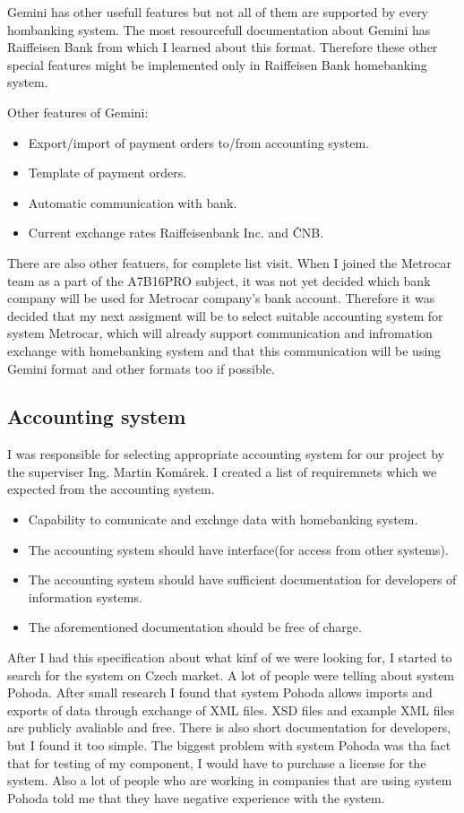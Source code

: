 \documentclass[11pt,twoside,a4paper]{book}
\begin{document}
Gemini has other usefull features but not all of them are supported by every hombanking system. 
The most resourcefull documentation about Gemini has Raiffeisen Bank\cite{rfb} from which I learned about this format.
Therefore these other special features might be implemented only in Raiffeisen Bank homebanking system. 

Other features of Gemini:
\begin{itemize}
	\item Export/import of payment orders to/from accounting system.
	\item Template of payment orders.
	\item Automatic communication with bank.
	\item Current exchange rates Raiffeisenbank Inc. and ČNB.
\end{itemize}
There are also other featuers, for complete list visit\cite{rfb}. When I joined the Metrocar team as a part of the A7B16PRO
subject, it was not yet decided which bank company will be used for Metrocar company's bank account. Therefore it was decided 
that my next assigment will be to select suitable accounting system for system Metrocar, which will already support communication and infromation exchange with homebanking system and that this communication will be using Gemini format and other formats too if possible. 

\subsection{Accounting system}
I was responsible for selecting appropriate accounting system for our project by the superviser Ing. Martin Komárek. I created a list of requiremnets which we expected from the accounting system. 
\begin{itemize}
	\item Capability to comunicate and exchnge data with homebanking system.
	\item The accounting system should have interface(for access from other systems).
	\item The accounting system should have sufficient documentation for developers of information systems.
	\item The aforementioned documentation should be free of charge. 
\end{itemize}
After I had this specification about what kinf of we were looking for, I started to search for the system on Czech market. 
A lot of people were telling about system Pohoda\cite{pohoda}. After small research I found that system Pohoda allows 
imports and exports of data through exchange of XML files\cite{xmlPohoda}. XSD files and example XML files are publicly avaliable and free. There is also short documentation for developers, but I found it too simple. The biggest problem with system Pohoda was tha fact that for testing of my component, I would have to purchase a license for the system. Also a lot of people who are working in companies that are using system Pohoda told me that they have negative experience with the system. 
\end{document}
